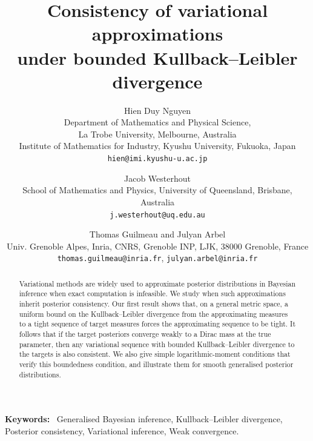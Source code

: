 \documentclass[11pt]{article}
\theoremstyle{plain}
\theoremstyle{definition}
\theoremstyle{remark}
\newenvironment{keywords}{%
  \par\smallskip\noindent\textbf{Keywords:}\ }{\par\smallskip}
\begin{document}
\raggedbottom

\title{Consistency of variational approximations\\ under bounded Kullback--Leibler divergence}

\author{%
Hien Duy Nguyen\\
Department of Mathematics and Physical Science,\\ La Trobe University, Melbourne, Australia\\
Institute of Mathematics for Industry, Kyushu University, Fukuoka, Japan\\
\texttt{hien@imi.kyushu-u.ac.jp}
\and
Jacob Westerhout\\
School of Mathematics and Physics, University of Queensland, Brisbane, Australia\\
\texttt{j.westerhout@uq.edu.au}
\and
Thomas Guilmeau and Julyan Arbel\\
Univ. Grenoble Alpes, Inria, CNRS, Grenoble INP, LJK, 38000 Grenoble, France\\
\texttt{thomas.guilmeau@inria.fr}, \texttt{julyan.arbel@inria.fr}}

\date{}

\maketitle

\begin{abstract}
Variational methods are widely used to approximate posterior distributions in Bayesian inference when exact computation is infeasible. We study when such approximations inherit posterior consistency. Our first result shows that, on a general metric space, a uniform bound on the Kullback--Leibler divergence from the approximating measures to a tight sequence of target measures forces the approximating sequence to be tight. It follows that if the target posteriors converge weakly to a Dirac mass at the true parameter, then any variational sequence with bounded Kullback--Leibler divergence to the targets is also consistent. We also give simple logarithmic-moment conditions that verify this boundedness condition, and illustrate them for smooth generalised posterior distributions.
\end{abstract}

\begin{keywords}
Generalised Bayesian inference,
Kullback--Leibler divergence,
Posterior consistency,
Variational inference,
Weak convergence.
\end{keywords}
\end{document}

